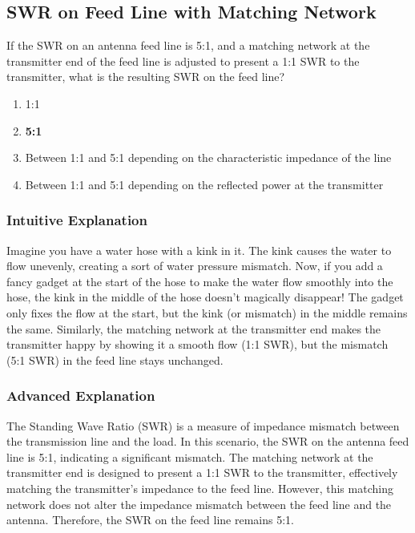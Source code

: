 \subsection{SWR on Feed Line with Matching Network}
\label{G9A08}

\begin{tcolorbox}[colback=gray!10!white,colframe=black!75!black,title=G9A08]
If the SWR on an antenna feed line is 5:1, and a matching network at the transmitter end of the feed line is adjusted to present a 1:1 SWR to the transmitter, what is the resulting SWR on the feed line?
\begin{enumerate}[label=\Alph*),noitemsep]
    \item 1:1
    \item \textbf{5:1}
    \item Between 1:1 and 5:1 depending on the characteristic impedance of the line
    \item Between 1:1 and 5:1 depending on the reflected power at the transmitter
\end{enumerate}
\end{tcolorbox}

\subsubsection{Intuitive Explanation}
Imagine you have a water hose with a kink in it. The kink causes the water to flow unevenly, creating a sort of water pressure mismatch. Now, if you add a fancy gadget at the start of the hose to make the water flow smoothly into the hose, the kink in the middle of the hose doesn't magically disappear! The gadget only fixes the flow at the start, but the kink (or mismatch) in the middle remains the same. Similarly, the matching network at the transmitter end makes the transmitter happy by showing it a smooth flow (1:1 SWR), but the mismatch (5:1 SWR) in the feed line stays unchanged.

\subsubsection{Advanced Explanation}
The Standing Wave Ratio (SWR) is a measure of impedance mismatch between the transmission line and the load. In this scenario, the SWR on the antenna feed line is 5:1, indicating a significant mismatch. The matching network at the transmitter end is designed to present a 1:1 SWR to the transmitter, effectively matching the transmitter's impedance to the feed line. However, this matching network does not alter the impedance mismatch between the feed line and the antenna. Therefore, the SWR on the feed line remains 5:1.

